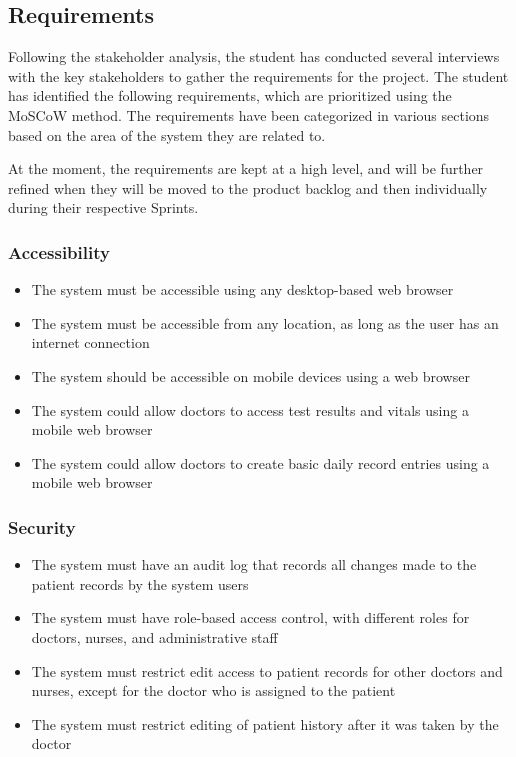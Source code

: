 \subsection{Requirements}

Following the stakeholder analysis, the student has conducted several interviews with the key stakeholders to gather the requirements for the project. The student has identified the following requirements, which are prioritized using the MoSCoW method. The requirements have been categorized in various sections based on the area of the system they are related to. 

At the moment, the requirements are kept at a high level, and will be further refined when they will be moved to the product backlog and then individually during their respective Sprints.

\subsubsection{Accessibility}
\begin{itemize}
    \item The system must be accessible using any desktop-based web browser
    \item The system must be accessible from any location, as long as the user has an internet connection
    \item The system should be accessible on mobile devices using a web browser
    \item The system could allow doctors to access test results and vitals using a mobile web browser
    \item The system could allow doctors to create basic daily record entries using a mobile web browser
\end{itemize}

\subsubsection{Security}
\begin{itemize}
    \item The system must have an audit log that records all changes made to the patient records by the system users
    \item The system must have role-based access control, with different roles for doctors, nurses, and administrative staff
    \item The system must restrict edit access to patient records for other doctors and nurses, except for the doctor who is assigned to the patient
    \item The system must restrict editing of patient history after it was taken by the doctor
\end{itemize}

